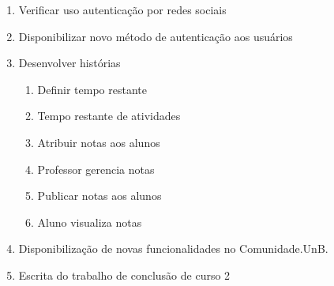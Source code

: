 \begin{enumerate}
\item Verificar uso autenticação por redes sociais
\item Disponibilizar novo método de autenticação aos usuários
\item Desenvolver histórias
\begin{enumerate}
\item Definir tempo restante
\item Tempo restante de atividades
\item Atribuir notas aos alunos
\item Professor gerencia notas
\item Publicar notas aos alunos
\item Aluno visualiza notas
\end{enumerate}
\item Disponibilização de novas funcionalidades no Comunidade.UnB.
\item Escrita do trabalho de conclusão de curso 2
\end{enumerate}

